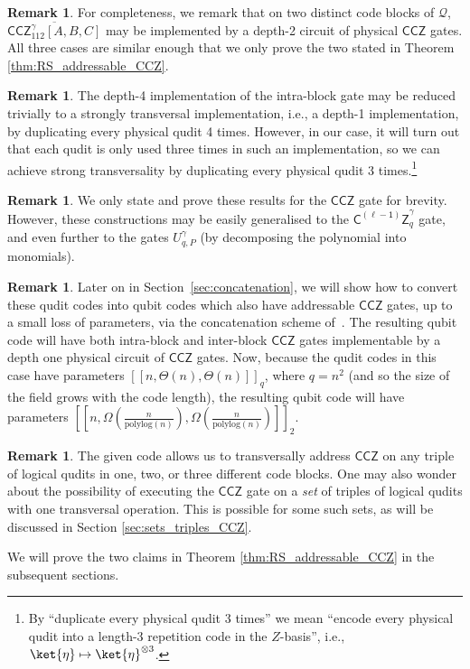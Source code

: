 \documentclass[11pt]{article}
\theoremstyle{definition}
\newtheorem{remark}[theorem]{Remark}
\newcommand{\CCZ}{\mathsf{CCZ}}
\newcommand{\CLZ}{\mathsf{C^{(\ell-1)}Z}}
\newcommand{\qcode}{\mathcal{Q}}
\newcommand*{\ol}{\overline}
\begin{document}
\begin{remark} 
    For completeness, we remark that on two distinct code blocks of $\qcode$, $\ol{\CCZ_{112}^\gamma[A,B,C]}$ may be implemented by a depth-2 circuit of physical $\CCZ$ gates. All three cases are similar enough that we only prove the two stated in  Theorem \ref{thm:RS_addressable_CCZ}.
\end{remark}
\begin{remark}\label{rmk:flatten-depth}
    The depth-4 implementation of the intra-block gate may be reduced trivially to a strongly transversal implementation, i.e., a depth-1 implementation, by duplicating every physical qudit 4 times. However, in our case, it will turn out that each qudit is only used three times in such an implementation, so we can achieve strong transversality by duplicating every physical qudit 3 times.\footnote{By ``duplicate every physical qudit 3 times'' we mean ``encode every physical qudit into a length-3 repetition code in the $Z$-basis'', i.e., $\ket{\eta} \mapsto \ket{\eta}^{\otimes 3}$.}
\end{remark}
\begin{remark}\label{rmk:high_degree_poly_gates}
    We only state and prove these results for the $\CCZ$ gate for brevity. However, these constructions may be easily generalised to the $\CLZ_q^\gamma$ gate, and even further to the gates $U_{q,P}^\gamma$ (by decomposing the polynomial into monomials).
\end{remark}
\begin{remark}
    Later on in Section~\ref{sec:concatenation}, we will show how to convert these qudit codes into qubit codes which also have addressable $\CCZ$ gates, up to a small loss of parameters, via the concatenation scheme of~\cite{nguyen2024goodbinaryquantumcodes}. The resulting qubit code will have both intra-block and inter-block $\CCZ$ gates implementable by a depth one physical circuit of $\CCZ$ gates. Now, because the qudit codes in this case have parameters $[[n,\Theta(n),\Theta(n)]]_q$, where $q = n^2$ (and so the size of the field grows with the code length), the resulting qubit code will have parameters $\left[\left[n,\Omega\left(\frac{n}{\text{polylog}(n)}\right),\Omega\left(\frac{n}{\text{polylog}(n)}\right)\right]\right]_2$.
\end{remark}
\begin{remark}\label{rmk:sets_triples}
    The given code allows us to transversally address $\CCZ$ on any triple of logical qudits in one, two, or three different code blocks. One may also wonder about the possibility of executing the $\CCZ$ gate on a \textit{set} of triples of logical qudits with one transversal operation. This is possible for some such sets, as will be discussed in Section \ref{sec:sets_triples_CCZ}.
\end{remark}
We will prove the two claims in Theorem \ref{thm:RS_addressable_CCZ} in the subsequent sections.
\end{document}
